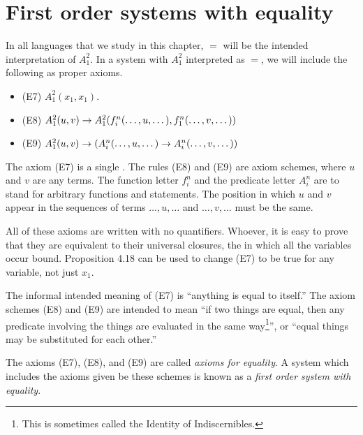 \section{First order systems with equality}
In all languages that we study in this chapter, \(=\) will be the intended interpretation of \(A^2_1\). In a system with \(A^2_1\) interpreted as \(=\), we will include the following as proper axioms.

\begin{itemize}
  \item (E7) \(A^2_1(x_1, x_1)\).
  \item (E8) \(A^2_1(u, v) \rightarrow A^2_1(f^n_i(\dots, u, \dots), f^n_1(\dots, v, \dots))\)
  \item (E9) \(A^2_1(u, v) \rightarrow (A^n_i(\dots, u, \dots) \rightarrow A^n_i(\dots, v, \dots))\)
\end{itemize}
The axiom (E7) is a single \wf{}. The rules (E8) and (E9) are axiom schemes, where \(u\) and \(v\) are any terms. The function letter \(f^n_i\) and the predicate letter \(A^n_i\) are to stand for arbitrary functions and statements. The position in which \(u\) and \(v\) appear in the sequences of terms \(\dots, u, \dots\) and \(\dots, v, \dots\) must be the same.

All of these axioms are written with no quantifiers. Whoever, it is easy to prove that they are equivalent to their universal closures, the \wfs{} in which all the variables occur bound. Proposition 4.18 can be used to change (E7) to be true for any variable, not just \(x_1\).

The informal intended meaning of (E7) is ``anything is equal to itself.'' The axiom schemes (E8) and (E9) are intended to mean ``if two things are equal, then any predicate involving the things are evaluated in the same way\footnote{This is sometimes called the Identity of Indiscernibles.}'', or ``equal things may be substituted for each other.''

\setcounter{definition}{3}
\begin{definition}
  The axioms (E7), (E8), and (E9) are called \textit{axioms for equality}. A system which includes the axioms given be these schemes is known as a \textit{first order system with equality}.
\end{definition}

